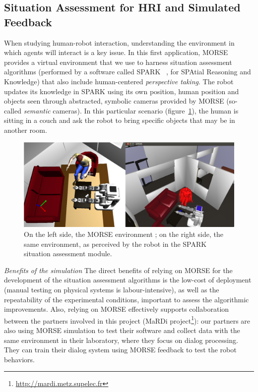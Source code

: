 \documentclass{llncs}
\begin{document}
\subsection{Situation Assessment for HRI and Simulated Feedback}
\label{sc:assessment}

When studying human-robot interaction, understanding the environment in which
agents will interact is a key issue. In this first application, MORSE provides a
virtual environment that we use to harness situation assessment algorithms
(performed by a software called SPARK ~\cite{Warnier2012a}, for SPAtial Reasoning and Knowledge) that
also include human-centered \emph{perspective taking}. The robot updates its
knowledge in SPARK using its own position, human position and objects seen
through abstracted, symbolic cameras provided by MORSE (so-called
\emph{semantic} cameras). In this particular scenario (figure~\ref{fig|spark}),
the human is sitting in a couch and ask the robot to bring specific objects that
may be in another room.

\begin{figure}[t]
      \centering
      \includegraphics[width=0.7\linewidth]{morsespark.png}
      \caption{On the left side, the MORSE environment ; on the right side, the same
      environment, as perceived by the robot in the SPARK situation assessment
      module.}
      \label{fig|spark}
\end{figure}

\emph{Benefits of the simulation} The direct benefits of relying on MORSE for
the development of the situation assessment algorithms is the low-cost of
deployment (manual testing on physical systems is labour-intensive), as well as
the repeatability of the experimental conditions, important to assess the
algorithmic improvements.  Also, relying on MORSE effectively supports
collaboration between the partners involved in this project (MaRDi
project\footnote{\url{http://mardi.metz.supelec.fr}}): our partners are also
using MORSE simulation to test their software and collect data with the same
environment in their laboratory, where they focus on dialog processing. They can
train their dialog system using MORSE feedback to test the robot behaviors.
\end{document}

